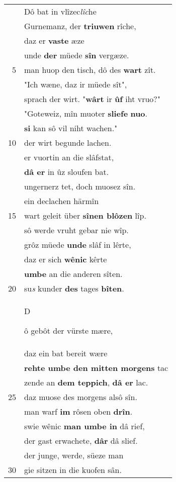 \documentclass[8pt,a4paper,notitlepage]{article}
\begin{document}
\begin{table}[ht]
\begin{minipage}[t]{0.5\linewidth}
\begin{tabular}{rl}
 & Dô bat in vlîzec\textit{lîc}he\\ 
 & Gurnemanz, der \textbf{triuwen} rîche,\\ 
 & daz er \textbf{vaste} æze\\ 
 & unde \textbf{der} müede \textbf{sîn} vergæze.\\ 
5 & man huop den tisch, dô des \textbf{wart} zît.\\ 
 & "Ich wæne, daz ir müede sît",\\ 
 & sprach der wirt. "\textbf{wârt} ir \textbf{ûf} iht vruo?"\\ 
 & "Goteweiz, mîn muoter \textbf{sliefe} \textbf{nuo}.\\ 
 & \textbf{si} kan sô vil niht wachen."\\ 
10 & der wirt begunde lachen.\\ 
 & er vuortin an die slâfstat,\\ 
 & \textbf{dâ er} in ûz sloufen bat.\\ 
 & ungernerz tet, doch muosez sîn.\\ 
 & ein declachen härmîn\\ 
15 & wart geleit über \textbf{sînen blôzen} lîp.\\ 
 & sô werde vruht gebar nie wîp.\\ 
 & grôz müede \textbf{unde} slâf in lêrte,\\ 
 & daz er sich \textbf{wênic} kêrte\\ 
 & \textbf{umbe} an die anderen sîten.\\ 
20 & su\textit{s} kunder \textbf{des} tages \textbf{bîten}.\\ 
 & \begin{large}D\end{large}ô gebôt der vürste mære,\\ 
 & daz ein bat bereit wære\\ 
 & \textbf{rehte umbe den mitten morgens} tac\\ 
 & zende an \textbf{dem teppich}, \textbf{dâ er} lac.\\ 
25 & daz muose des morgens alsô sîn.\\ 
 & man warf \textbf{im} rôsen oben \textbf{drîn}.\\ 
 & swie wênic \textbf{man umbe in} dâ rief,\\ 
 & der gast erwachete, \textbf{dâr} dâ slief.\\ 
 & der junge, werde, süeze man\\ 
30 & gie sitzen in die kuofen sân.\\ 

\end{tabular}
\end{minipage}
\end{table}
\end{document}
